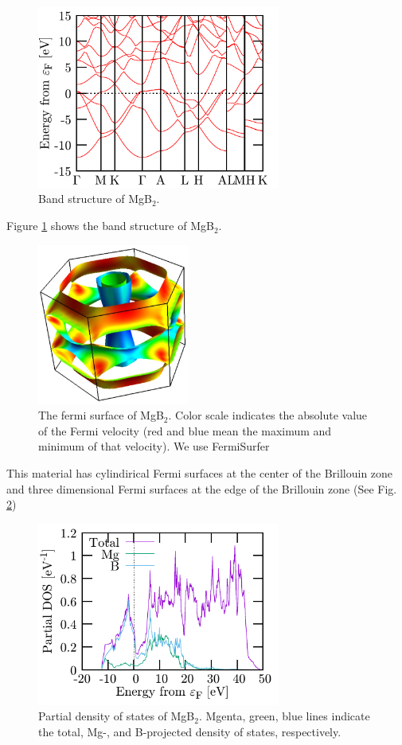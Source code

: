 \documentclass[twocolumn,11pt]{article}
\begin{document}
\begin{figure}[!tb]
  \begin{center}
    \includegraphics[width=8cm]{band.pdf}
    \caption{\label{fig_band}
      Band structure of MgB$_2$.
    }
  \end{center}
\end{figure}
%
Figure \ref{fig_band} shows the band structure of MgB$_2$.
%
\begin{figure}[!tb]
  \begin{center}
    \includegraphics[width=5cm]{vfermi.png}
    \caption{\label{fig_fs}
      The fermi surface of MgB$_2$.
      Color scale indicates the absolute value of the Fermi velocity
      (red and blue mean the maximum and minimum of that velocity).
      We use FermiSurfer \cite{fermisurfer}
    }
  \end{center}
\end{figure}
%
This material has cylindirical Fermi surfaces at the center of the Brillouin zone and
three dimensional Fermi surfaces at the edge of the Brillouin zone (See Fig. \ref{fig_fs})
%
\begin{figure}[!tb]
  \begin{center}
    \includegraphics[width=8cm]{pdos.pdf}
    \caption{\label{fig_pdos}
      Partial density of states of MgB$_2$.
      Mgenta, green, blue lines indicate
      the total, Mg-, and B-projected density of states, respectively.
    }
  \end{center}
\end{figure}
\end{document}
